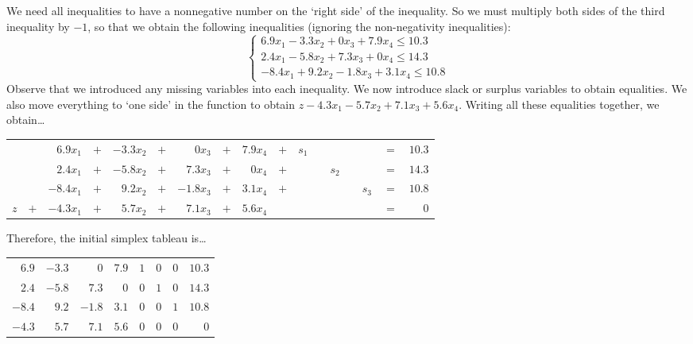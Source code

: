 \documentclass[12pt,letterpaper]{exam}
\begin{document}
\begin{questions}
\sol We need all inequalities to have a nonnegative number on the `right side' of the inequality. So we must multiply both sides of the third inequality by $-1$, so that we obtain the following inequalities (ignoring the non-negativity inequalities): 
	\[
	\begin{cases}
	6.9x_1 - 3.3x_2 + 0x_3 + 7.9x_4 \leq 10.3 \\
	2.4x_1 - 5.8x_2 + 7.3x_3 + 0x_4 \leq 14.3 \\
	-8.4x_1 + 9.2x_2 - 1.8x_3 + 3.1x_4 \leq 10.8 
	\end{cases}
	\]
Observe that we introduced any missing variables into each inequality. We now introduce slack or surplus variables to obtain equalities. We also move everything to `one side' in the function to obtain $z - 4.3x_1 - 5.7x_2 + 7.1x_3 + 5.6 x_4$. Writing all these equalities together, we obtain\dots \par
	\begin{table}[H]
	\centering
	\begin{tabular}{rrrrrrrrrrrrrrrrr}
			&& $6.9x_1$ & $+$ & $-3.3x_2$ & $+$ & $0x_3$ & $+$ & $7.9x_4$ & $+$ & $s_1$ & & & & & $=$ & $10.3$ \\ 
			&& $2.4x_1$ & $+$ & $-5.8x_2$ & $+$ & $7.3x_3$ & $+$ & $0x_4$ & $+$ & & & $s_2$ & & & $=$ & $14.3$ \\
			&& $-8.4x_1$ & $+$ & $9.2x_2$ & $+$ & $-1.8x_3$ & $+$ & $3.1x_4$ & $+$ & & & & & $s_3$ & $=$ & $10.8$ \\
	$z$ & $+$ & $-4.3x_1$ & $+$ & $5.7x_2$ & $+$ & $7.1x_3$ & $+$ & $5.6x_4$ & & & & & & & $=$ & $0$
	\end{tabular}
	\end{table} \par
Therefore, the initial simplex tableau is\dots \par
	\begin{table}[H]
	\centering
	\begin{tabular}{rrrrrrr|r}
	$6.9$ & $-3.3$ & $0$ & $7.9$ & $1$ & $0$ & $0$ & $10.3$ \\
	$2.4$ & $-5.8$ & $7.3$ & $0$ & $0$ & $1$ & $0$ & $14.3$ \\
	$-8.4$ & $9.2$ & $-1.8$ & $3.1$ & $0$ & $0$ & $1$ & $10.8$ \\ \hline
	$-4.3$ & $5.7$ & $7.1$ & $5.6$ & $0$ & $0$ & $0$ & $0$
	\end{tabular}
	\end{table} 




\end{questions}
\end{document}
